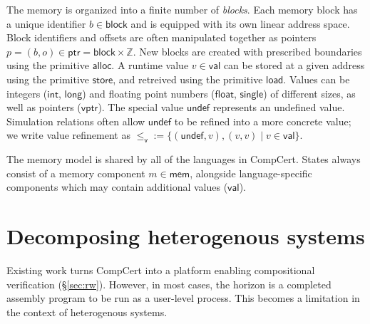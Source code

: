 \documentclass[draft,11pt]{report}
\newcommand{\kw}[1]{\ensuremath{ \mathsf{#1} }}
\newcommand{\vref}{\le_\kw{v}}   %
\begin{document}
The memory is organized into a finite number of \emph{blocks}.
Each memory block has a unique identifier $b \in \kw{block}$
and is equipped with its own linear address space.
Block identifiers and offsets are often manipulated together
as pointers $p = (b, o) \in \kw{ptr} = \kw{block} \times \mathbb{Z}$.
New blocks are created with prescribed boundaries
using the primitive $\kw{alloc}$.
A runtime value $v \in \kw{val}$ can be stored at
a given address using the primitive \kw{store},
and retreived using the primitive \kw{load}.
Values can be integers (\kw{int}, \kw{long}) and
floating point numbers (\kw{float}, \kw{single})
of different sizes,
as well as pointers (\kw{vptr}).
The special value \kw{undef}
represents an undefined value.
Simulation relations
often allow $\kw{undef}$
to be refined into a more concrete value;
we write value refinement as
${\vref} := \{(\kw{undef}, v), (v, v) \mid v \in \kw{val}\}$.

The memory model is shared by all of the languages in CompCert.
States always consist of
a memory component $m \in \kw{mem}$,
alongside language-specific components
which may contain additional values ($\kw{val}$).



\section{Decomposing heterogenous systems} %

Existing work turns CompCert
into a platform enabling compositional verification (\S\ref{sec:rw}).
However, in most cases,
the horizon is a completed assembly program to be run as a user-level process.
This becomes a limitation in the context of heterogenous systems.
\end{document}
